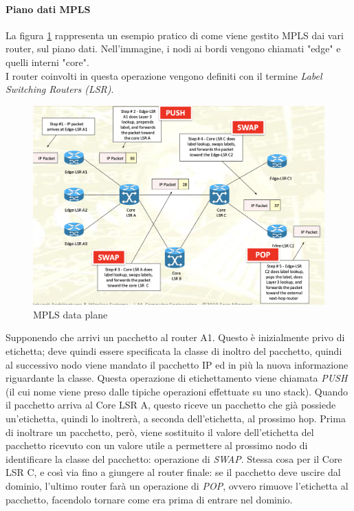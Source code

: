\documentclass{article}
\begin{document}
\paragraph{Piano dati MPLS} La figura \ref{figura:dati-mpls} rappresenta un esempio pratico di come viene gestito MPLS dai vari router, sul piano dati. Nell'immagine, i nodi ai bordi vengono chiamati "edge" e quelli interni "core". \\ I router coinvolti in questa operazione vengono definiti con il termine \textit{Label Switching Routers (LSR)}. 
\begin{figure}[H]
    \centering
    \includegraphics[scale=0.4]{figures/mpls data plane.png}
    \caption{MPLS data plane}\label{figura:dati-mpls}
\end{figure}
\noindent Supponendo che arrivi un pacchetto al router A1. Questo è inizialmente privo di etichetta; deve quindi essere specificata la classe di inoltro del pacchetto, quindi al successivo nodo viene mandato il pacchetto IP ed in più la nuova informazione riguardante la classe. Questa operazione di etichettamento viene chiamata \textit{PUSH} (il cui nome viene preso dalle tipiche operazioni effettuate su uno stack). Quando il pacchetto arriva al Core LSR A, questo riceve un pacchetto che già possiede un'etichetta, quindi lo inoltrerà, a seconda dell'etichetta, al prossimo hop. Prima di inoltrare un pacchetto, però, viene sostituito il valore dell'etichetta del pacchetto ricevuto con un valore utile a permettere al prossimo nodo di identificare la classe del pacchetto: operazione di \textit{SWAP}. Stessa cosa per il Core LSR C, e così via fino a giungere al router finale: se il pacchetto deve uscire dal dominio, l'ultimo router farà un operazione di \textit{POP}, ovvero rimuove l'etichetta al pacchetto, facendolo tornare come era prima di entrare nel dominio.
\end{document}
